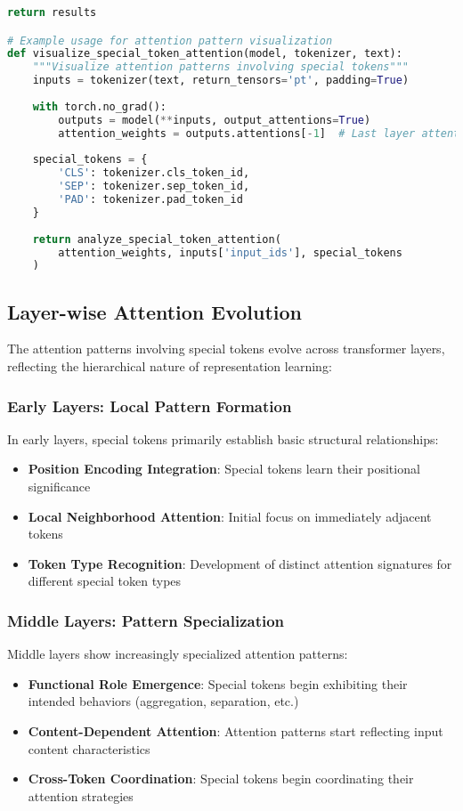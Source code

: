 \begin{lstlisting}[language=Python, caption=Attention pattern analysis with special tokens]
    return results

# Example usage for attention pattern visualization
def visualize_special_token_attention(model, tokenizer, text):
    """Visualize attention patterns involving special tokens"""
    inputs = tokenizer(text, return_tensors='pt', padding=True)
    
    with torch.no_grad():
        outputs = model(**inputs, output_attentions=True)
        attention_weights = outputs.attentions[-1]  # Last layer attention
    
    special_tokens = {
        'CLS': tokenizer.cls_token_id,
        'SEP': tokenizer.sep_token_id,
        'PAD': tokenizer.pad_token_id
    }
    
    return analyze_special_token_attention(
        attention_weights, inputs['input_ids'], special_tokens
    )
\end{lstlisting}

\subsection{Layer-wise Attention Evolution}

The attention patterns involving special tokens evolve across transformer layers, reflecting the hierarchical nature of representation learning:

\subsubsection{Early Layers: Local Pattern Formation}

In early layers, special tokens primarily establish basic structural relationships:
\begin{itemize}
\item \textbf{Position Encoding Integration}: Special tokens learn their positional significance
\item \textbf{Local Neighborhood Attention}: Initial focus on immediately adjacent tokens
\item \textbf{Token Type Recognition}: Development of distinct attention signatures for different special token types
\end{itemize}

\subsubsection{Middle Layers: Pattern Specialization}

Middle layers show increasingly specialized attention patterns:
\begin{itemize}
\item \textbf{Functional Role Emergence}: Special tokens begin exhibiting their intended behaviors (aggregation, separation, etc.)
\item \textbf{Content-Dependent Attention}: Attention patterns start reflecting input content characteristics
\item \textbf{Cross-Token Coordination}: Special tokens begin coordinating their attention strategies
\end{itemize}

